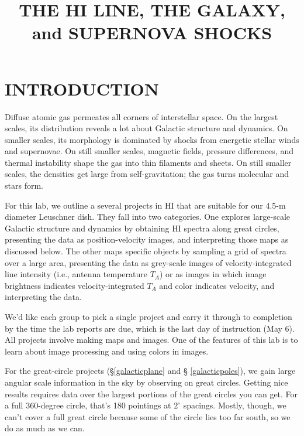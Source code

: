 \documentclass[preprint]{aastex}
\begin{document}
\def\simlt{\lower.5ex\hbox{$\; \buildrel < \over \sim \;$}}
\def\simgt{\lower.5ex\hbox{$\; \buildrel > \over \sim \;$}}

\title{THE HI LINE, THE GALAXY, and SUPERNOVA SHOCKS}

\tableofcontents

\section{INTRODUCTION}

	Diffuse atomic gas permeates all corners of interstellar space.
On the largest scales, its distribution reveals a lot about Galactic
structure and dynamics. On smaller scales, its morphology is dominated
by shocks from energetic stellar winds and supernovae. On still smaller
scales, magnetic fields, pressure differences, and thermal instability
shape the gas into thin filaments and sheets. On still smaller scales,
the densities get large from self-gravitation; the gas turns molecular
and stars form. 

For this lab, we outline a several projects in HI that are suitable for
our 4.5-m diameter Leuschner dish. They fall into two categories. One
explores large-scale Galactic structure and dynamics by obtaining HI
spectra along great circles, presenting the data as position-velocity
images, and interpreting those maps as discussed below. The other maps
specific objects by sampling a grid of spectra over a large area,
presenting the data as grey-scale images of velocity-integrated line
intensity (i.e., antenna temperature $T_A$) or as images in which image
brightness indicates velocity-integrated $T_A$ and color indicates
velocity, and interpreting the data.

We'd like each group to pick a single project and carry it through to
completion by the time the lab reports are due, which is the last day of
instruction (May 6). All projects involve making maps and images. One of
the features of this lab is to learn about image processing and using
colors in images.

For the great-circle projects (\S \ref{galacticplane} and \S
\ref{galacticpoles}), we gain large angular scale information
in the sky by observing on great circles. Getting nice results
requires data over the largest portions of the great circles you can
get. For a full 360-degree circle, that's 180 pointings at $2^\circ$
spacings.  Mostly, though, we can't cover a full great circle because
some of the circle lies too far south, so we do as much as we can. 
\end{document}
